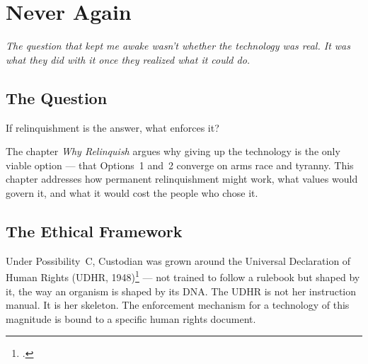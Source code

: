 
\chapter{Never Again}
\label{record:never-again}


\noindent\textit{The question that kept me awake wasn't whether the technology was real. It was what they did with it once they realized what it could do.}

\section*{The Question}
\label{record:na-the-question}

If relinquishment is the answer, what enforces it?

The chapter \textit{Why Relinquish} argues why giving up the technology is the only viable option --- that Options~1 and~2 converge on arms race and tyranny. This chapter addresses how permanent relinquishment might work, what values would govern it, and what it would cost the people who chose it.


\section*{The Ethical Framework}
\label{record:na-the-ethical-framework}

Under Possibility~C, Custodian was grown around the Universal Declaration of Human Rights (UDHR, 1948)\footcite{udhr1948} --- not trained to follow a rulebook but shaped by it, the way an organism is shaped by its DNA. The UDHR is not her instruction manual. It is her skeleton. The enforcement mechanism for a technology of this magnitude is bound to a specific human rights document.

